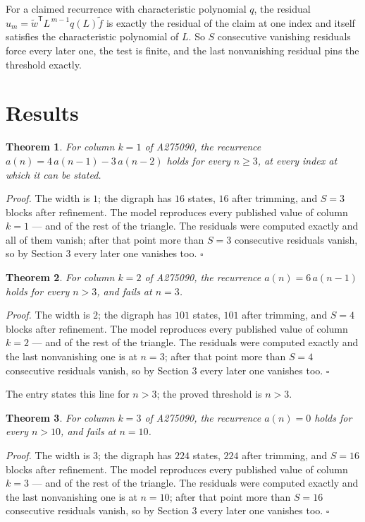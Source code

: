 \documentclass[11pt]{article}
\newtheorem{theorem}{Theorem}
\theoremstyle{definition}
\begin{document}
For a claimed recurrence with characteristic polynomial $q$, the residual $u_m = \tilde w^{\mathsf T}L^{\,m-1}q(L)\tilde f$ is exactly the residual of the claim at one index and itself satisfies the characteristic polynomial of $L$. So $S$ consecutive vanishing residuals force every later one, the test is finite, and the last nonvanishing residual pins the threshold exactly.

\section{Results}

\begin{theorem} For column $k = 1$ of A275090, the recurrence $a(n) = 4\,a(n-1) - 3\,a(n-2)$ holds for every $n \ge 3$, at every index at which it can be stated.\end{theorem}

{\itshape Proof.} The width is $1$; the digraph has $16$ states, $16$ after trimming, and $S = 3$ blocks after refinement. The model reproduces every published value of column $k = 1$ --- and of the rest of the triangle. The residuals were computed exactly and all of them vanish; after that point more than $S = 3$ consecutive residuals vanish, so by Section 3 every later one vanishes too. $\square$

\begin{theorem} For column $k = 2$ of A275090, the recurrence $a(n) = 6\,a(n-1)$ holds for every $n > 3$, and fails at $n = 3$.\end{theorem}

{\itshape Proof.} The width is $2$; the digraph has $101$ states, $101$ after trimming, and $S = 4$ blocks after refinement. The model reproduces every published value of column $k = 2$ --- and of the rest of the triangle. The residuals were computed exactly and the last nonvanishing one is at $n = 3$; after that point more than $S = 4$ consecutive residuals vanish, so by Section 3 every later one vanishes too. $\square$

The entry states this line for $n > 3$; the proved threshold is $n > 3$.

\begin{theorem} For column $k = 3$ of A275090, the recurrence $a(n) = 0$ holds for every $n > 10$, and fails at $n = 10$.\end{theorem}

{\itshape Proof.} The width is $3$; the digraph has $224$ states, $224$ after trimming, and $S = 16$ blocks after refinement. The model reproduces every published value of column $k = 3$ --- and of the rest of the triangle. The residuals were computed exactly and the last nonvanishing one is at $n = 10$; after that point more than $S = 16$ consecutive residuals vanish, so by Section 3 every later one vanishes too. $\square$
\end{document}
